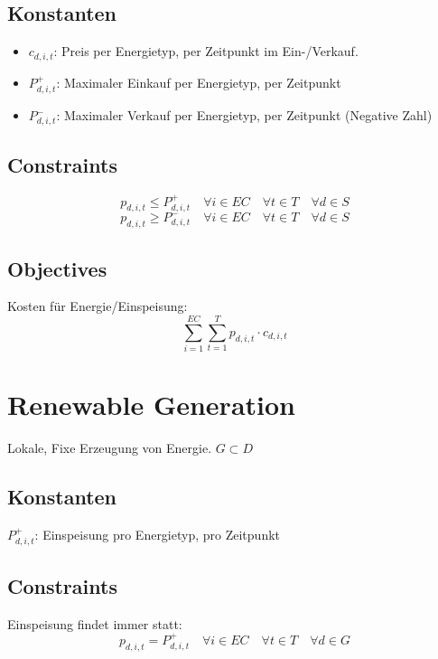 \documentclass[]{article}
\begin{document}
\subsection{Konstanten}
\begin{itemize}
    \item $c_{d,i,t}$: Preis per Energietyp, per Zeitpunkt im Ein-/Verkauf.
    \item $P_{d,i,t}^{+}$: Maximaler Einkauf per Energietyp, per Zeitpunkt
    \item $P_{d,i,t}^{-}$: Maximaler Verkauf per Energietyp, per Zeitpunkt (Negative Zahl)
\end{itemize}
\subsection{Constraints}
\begin{equation}
    p_{d,i,t} \leq P_{d,i,t}^{+} \quad \forall i \in EC \quad \forall t \in T
\quad \forall d \in S
\end{equation}
\begin{equation}
    p_{d,i,t} \geq P_{d,i,t}^{-} \quad \forall i \in EC \quad \forall t \in T
\quad \forall d \in S
\end{equation}
\subsection{Objectives}
Kosten für Energie/Einspeisung:
\begin{equation}
    \sum_{i=1}^{EC} \sum_{t=1}^{T} p_{d,i,t} \cdot c_{d,i,t}
\end{equation}

\section{Renewable Generation}
Lokale, Fixe Erzeugung von Energie. $G \subset D$
\subsection{Konstanten}
$P_{d,i,t}^{+}$: Einspeisung pro Energietyp, pro Zeitpunkt
\subsection{Constraints}
Einspeisung findet immer statt:
\begin{equation}
    p_{d,i,t} = P_{d,i,t}^{+} \quad \forall i \in EC \quad \forall t \in T \quad \forall d \in G
\end{equation}
\end{document}
